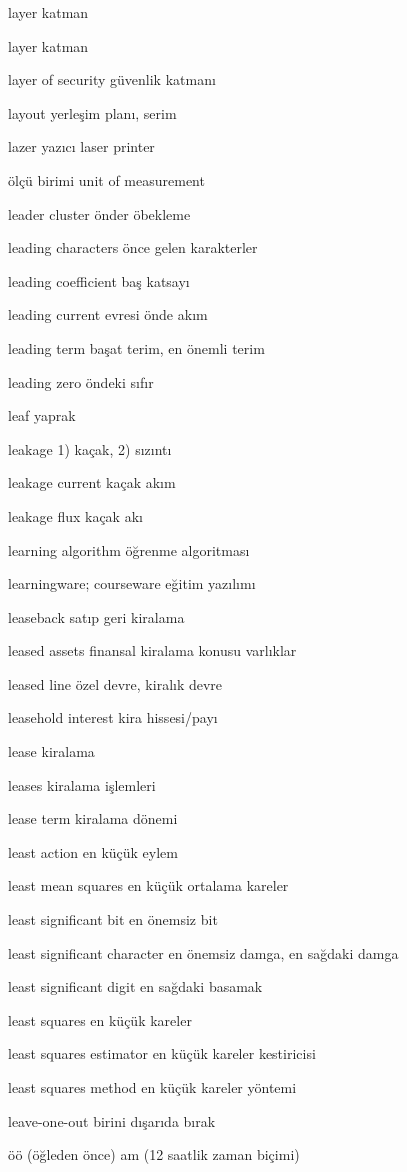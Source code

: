 \documentclass[12pt,fleqn]{article}\usepackage{../../common}
\begin{document}
layer katman

layer katman

layer of security güvenlik katmanı

layout yerleşim planı, serim

lazer yazıcı laser printer

ölçü birimi unit of measurement

leader cluster önder öbekleme

leading characters önce gelen karakterler

leading coefficient baş katsayı

leading current evresi önde akım

leading term başat terim, en önemli terim

leading zero öndeki sıfır

leaf yaprak

leakage 1) kaçak, 2) sızıntı

leakage current kaçak akım

leakage flux kaçak akı

learning algorithm öğrenme algoritması

learningware; courseware eğitim yazılımı

leaseback satıp geri kiralama

leased assets finansal kiralama konusu varlıklar

leased line özel devre, kiralık devre

leasehold interest kira hissesi/payı

lease kiralama

leases kiralama işlemleri

lease term kiralama dönemi

least action en küçük eylem

least mean squares en küçük ortalama kareler

least significant bit en önemsiz bit

least significant character en önemsiz damga, en sağdaki damga

least significant digit en sağdaki basamak

least squares en küçük kareler

least squares estimator en küçük kareler kestiricisi

least squares method en küçük kareler yöntemi

leave-one-out birini dışarıda bırak

öö (öğleden önce) am (12 saatlik zaman biçimi)
\end{document}
